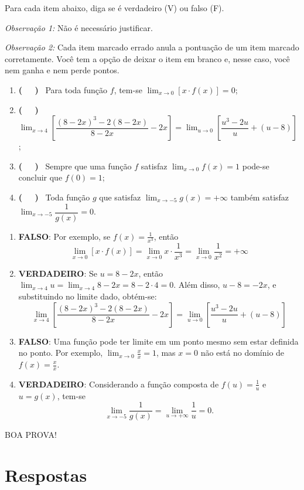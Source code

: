 \documentclass[12pt,a4paper]{article}
\begin{document}
\begin{ExerciseList}
\Exercise[title={2,0}] Para cada item abaixo, diga se é verdadeiro (V) ou falso (F).

\emph{Observação 1:} Não é necessário justificar.

\emph{Observação 2:} Cada item marcado errado anula a pontuação de um item marcado corretamente. Você tem a opção de deixar o item em branco e, nesse caso, você nem ganha e nem perde pontos.

\begin{enumerate}
  \item {\bf ( \ \ )} \ Para toda função $f$, tem-se $\displaystyle \lim_{x \to 0} \left[ x\cdot f(x) \right] = 0$;
  \item {\bf ( \ \ )} \ $\displaystyle \lim_{x \to 4} \left[ \dfrac{(8 - 2x)^3 - 2 (8 - 2x)}{8 - 2x} - 2x\right]
  = \lim_{u \to 0} \left[ \dfrac{u^3 - 2 u}{u} + \left(u-8\right)\right]$;
  \item {\bf ( \ \ )} \ Sempre que uma função $f$ satisfaz $\displaystyle \lim_{x \to 0} f(x) = 1$ pode-se concluir que $f(0) = 1$;
  \item {\bf ( \ \ )} \ Toda função $g$ que satisfaz $\displaystyle \lim_{x \to -5} g(x) = +\infty$ também satisfaz $\displaystyle \lim_{x \to -5} \dfrac{1}{ g(x) } = 0$.
\end{enumerate}
\Answer

\begin{enumerate}
  \item \textbf{FALSO}: Por exemplo, se $f(x) = \frac{1}{x^3}$, então
  \[
    \lim_{x \to 0} \left[ x\cdot f(x) \right]
    = \lim_{x \to 0} x\cdot \frac{1}{x^3}
    = \lim_{x \to 0} \frac{1}{x^2}
    = +\infty
  \]
  \item \textbf{VERDADEIRO}: Se $u = 8 - 2x$, então $\displaystyle\lim_{x \to 4} u = \lim_{x \to 4} 8-2x = 8-2\cdot 4 = 0$. Além disso, $u-8 = -2x$, e substituindo no limite dado, obtém-se:
  \[
  \lim_{x \to 4} \left[ \dfrac{(8 - 2x)^3 - 2 (8 - 2x)}{8 - 2x} - 2x\right]
  = \lim_{u \to 0} \left[ \dfrac{u^3 - 2 u}{u} + \left(u-8\right)\right]
  \]
  \item \textbf{FALSO}: Uma função pode ter limite em um ponto mesmo sem estar definida no ponto. Por exemplo, $\displaystyle\lim_{x \to 0} \frac{x}{x}= 1$, mas $x=0$ não está no domínio de $f(x) = \frac{x}{x}$.
  \item \textbf{VERDADEIRO}: Considerando a função composta de $f(u) = \frac{1}{u}$ e $u=g(x)$, tem-se
  \[
    \lim_{x \to -5} \dfrac{1}{ g(x) } = \lim_{u \to +\infty} \dfrac{1}{ u } = 0.
  \]
\end{enumerate}
\end{ExerciseList}

\begin{center}
BOA PROVA!
\end{center}

\newpage
\restoregeometry
\section*{Respostas}
\shipoutAnswer
\end{document}
